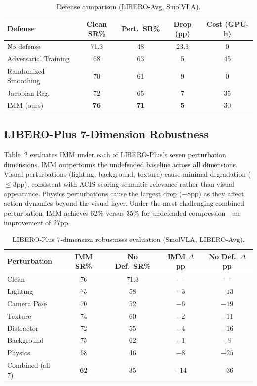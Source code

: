\documentclass[10pt,twocolumn]{article}
\begin{document}
\begin{table}[t]
\centering
\caption{Defense comparison (LIBERO-Avg, SmolVLA).}
\label{tab:defense}
\begin{tabular}{lcccc}
\toprule
Defense & Clean SR\% & Pert.\ SR\% & Drop (pp) & Cost (GPU-h) \\
\midrule
No defense & 71.3 & 48 & 23.3 & 0 \\
Adversarial Training & 68 & 63 & 5 & 45 \\
Randomized Smoothing & 70 & 61 & 9 & 0 \\
Jacobian Reg. & 72 & 65 & 7 & 35 \\
IMM (ours) & \textbf{76} & \textbf{71} & \textbf{5} & 30 \\
\bottomrule
\end{tabular}
\end{table}

\subsection{LIBERO-Plus 7-Dimension Robustness}
\label{sec:libero_plus}

Table~\ref{tab:libero_plus} evaluates IMM under each of LIBERO-Plus's seven perturbation dimensions. IMM outperforms the undefended baseline across all dimensions. Visual perturbations (lighting, background, texture) cause minimal degradation ($\leq 3$pp), consistent with ACIS scoring semantic relevance rather than visual appearance. Physics perturbations cause the largest drop ($-8$pp) as they affect action dynamics beyond the visual layer. Under the most challenging combined perturbation, IMM achieves 62\% versus 35\% for undefended compression---an improvement of 27pp.

\begin{table}[t]
\centering
\caption{LIBERO-Plus 7-dimension robustness evaluation (SmolVLA, LIBERO-Avg).}
\label{tab:libero_plus}
\begin{tabular}{lcccc}
\toprule
Perturbation & IMM SR\% & No Def.\ SR\% & IMM $\Delta$pp & No Def.\ $\Delta$pp \\
\midrule
Clean & 76 & 71.3 & --- & --- \\
Lighting & 73 & 58 & $-3$ & $-13$ \\
Camera Pose & 70 & 52 & $-6$ & $-19$ \\
Texture & 74 & 60 & $-2$ & $-11$ \\
Distractor & 72 & 55 & $-4$ & $-16$ \\
Background & 75 & 62 & $-1$ & $-9$ \\
Physics & 68 & 46 & $-8$ & $-25$ \\
Combined (all 7) & \textbf{62} & 35 & $-14$ & $-36$ \\
\bottomrule
\end{tabular}
\end{table}
\end{document}
